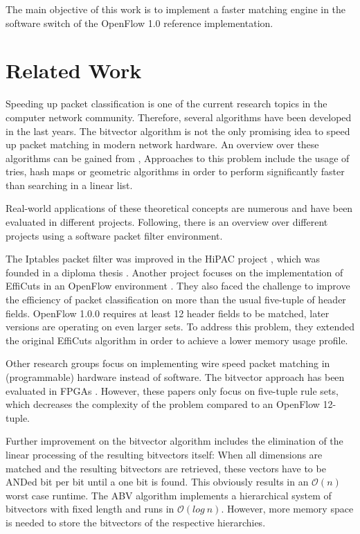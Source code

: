 \documentclass[a4paper,
		12pt,
		parskip=full,
		titlepage
		]{scrartcl}
\begin{document}
The main objective of this work is to implement a faster matching engine in the software switch of the OpenFlow 1.0 reference implementation.

\section{Related Work}
Speeding up packet classification is one of the current research topics in the computer network community.
Therefore, several algorithms have been developed in the last years.
The bitvector algorithm is not the only promising idea to speed up packet matching in modern network hardware.
An overview over these algorithms can be gained from \cite{algorithms_survey},
Approaches to this problem include the usage of tries, hash maps or geometric algorithms\cite{hicuts}
in order to perform significantly faster than searching in a linear list.

Real-world applications of these theoretical concepts are numerous and have been evaluated in different projects.
Following, there is an overview over different projects using a software packet filter environment.

The Iptables packet filter was improved in the HiPAC project \cite{hipac}, which was founded in a diploma thesis \cite{heinzhigh}.
Another project focuses on the implementation of EffiCuts in an OpenFlow environment \cite{stimpfling2013optimal}.
They also faced the challenge to improve the efficiency of packet classification on more than the usual five-tuple of header fields.
OpenFlow 1.0.0 \cite{openflow_spec10} requires at least 12 header fields to be matched, later versions are operating on even larger sets.
To address this problem, they extended the original EffiCuts algorithm in order to achieve a lower memory usage profile.

Other research groups focus on implementing wire speed packet matching in (programmable) hardware instead of software.
The bitvector approach \cite{bv} has been evaluated in FPGAs \cite{bitvector_fpga} \cite{qu2013fast}.
However, these papers only focus on five-tuple rule sets, which decreases the complexity of the problem compared to an OpenFlow 12-tuple.

Further improvement on the bitvector algorithm includes the elimination of the linear processing of the resulting bitvectors itself:
When all dimensions are matched and the resulting bitvectors are retrieved, these vectors have to be ANDed bit per bit until a one bit is found.
This obviously results in an $\mathcal O(n)$ worst case runtime.
The ABV algorithm \cite{abv} implements a hierarchical system of bitvectors with fixed length and runs in $\mathcal O(log\ n)$.
However, more memory space is needed to store the bitvectors of the respective hierarchies.
\end{document}
